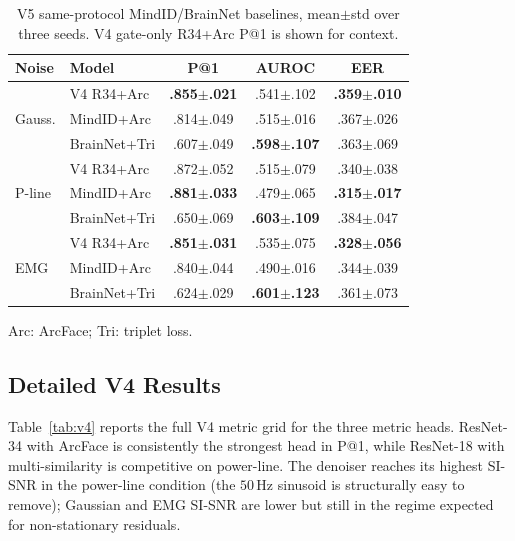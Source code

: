 \documentclass[conference,a4paper]{APSIPA2026}
\begin{document}
\begin{table}[t]
\centering
\caption{V5 same-protocol MindID/BrainNet baselines, mean$\pm$std over
three seeds. V4 gate-only R34+Arc P@1 is shown for context.}
\label{tab:v5}
\begin{threeparttable}
\scriptsize
\setlength{\tabcolsep}{2.8pt}
\begin{tabular}{l l c c c}
\toprule
\textbf{Noise} & \textbf{Model} & \textbf{P@1} & \textbf{AUROC} & \textbf{EER} \\
\midrule
\multirow{3}{*}{Gauss.}
 & V4 R34+Arc & \textbf{.855$\pm$.021} & .541$\pm$.102 & \textbf{.359$\pm$.010} \\
 & MindID+Arc & .814$\pm$.049 & .515$\pm$.016 & .367$\pm$.026 \\
 & BrainNet+Tri & .607$\pm$.049 & \textbf{.598$\pm$.107} & .363$\pm$.069 \\
\midrule
\multirow{3}{*}{P-line}
 & V4 R34+Arc & .872$\pm$.052 & .515$\pm$.079 & .340$\pm$.038 \\
 & MindID+Arc & \textbf{.881$\pm$.033} & .479$\pm$.065 & \textbf{.315$\pm$.017} \\
 & BrainNet+Tri & .650$\pm$.069 & \textbf{.603$\pm$.109} & .384$\pm$.047 \\
\midrule
\multirow{3}{*}{EMG}
 & V4 R34+Arc & \textbf{.851$\pm$.031} & .535$\pm$.075 & \textbf{.328$\pm$.056} \\
 & MindID+Arc & .840$\pm$.044 & .490$\pm$.016 & .344$\pm$.039 \\
 & BrainNet+Tri & .624$\pm$.029 & \textbf{.601$\pm$.123} & .361$\pm$.073 \\
\bottomrule
\end{tabular}
\begin{tablenotes}\footnotesize
\item Arc: ArcFace; Tri: triplet loss.
\end{tablenotes}
\end{threeparttable}
\end{table}

\subsection{Detailed V4 Results}
Table~\ref{tab:v4} reports the full V4 metric grid for the three
metric heads. ResNet-34 with ArcFace is consistently the strongest head
in P@1, while ResNet-18 with multi-similarity is competitive on
power-line. The denoiser reaches its highest SI-SNR in the
power-line condition (the $50$\,Hz sinusoid is structurally easy to
remove); Gaussian and EMG SI-SNR are lower but still in the regime
expected for non-stationary residuals.
\end{document}
